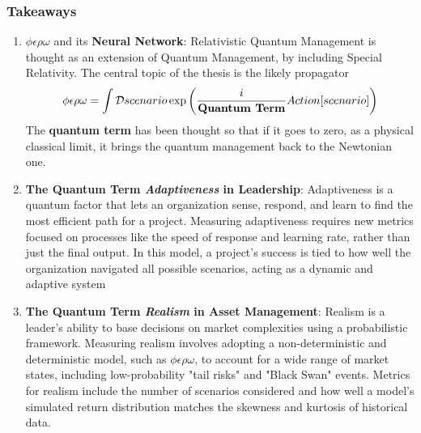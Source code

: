 \documentclass{article}
\begin{document}
\subsubsection*{Takeaways}
\begin{enumerate}
    \item \textbf{$\phi \epsilon \rho \omega$} and its \textbf{Neural Network}:
    Relativistic Quantum Management is thought as an extension of Quantum Management, by including Special Relativity.
    The central topic of the thesis is the likely propagator
     \begin{equation*}
    \phi \epsilon \rho \omega = \int \mathcal{D}scenario \exp\left( \frac{i}{\text{\textbf{Quantum Term}}} Action[scenario] \right)
    \end{equation*}
    The \textbf{quantum term} has been thought so that if it goes to zero, as a physical classical limit, it brings the quantum management back to the Newtonian one.
    \item \textbf{The Quantum Term \textit{Adaptiveness} in Leadership}: Adaptiveness is a quantum factor that lets an organization sense, respond, and learn to find the most efficient path for a project. Measuring adaptiveness requires new metrics focused on processes like the speed of response and learning rate, rather than just the final output. In this model, a project's success is tied to how well the organization navigated all possible scenarios, acting as a dynamic and adaptive system
    \item \textbf{The Quantum Term \textit{Realism} in Asset Management}: Realism is a leader's ability to base decisions on market complexities using a probabilistic framework. Measuring realism involves adopting a non-deterministic and  deterministic model, such as $\phi \epsilon \rho \omega$, to account for a wide range of market states, including low-probability "tail risks" and "Black Swan" events. Metrics for realism include the number of scenarios considered and how well a model's simulated return distribution matches the skewness and kurtosis of historical data.

\end{enumerate}
\end{document}

